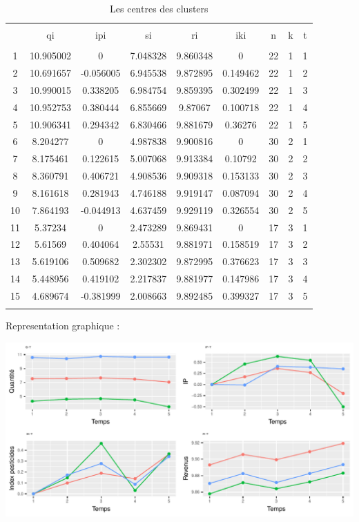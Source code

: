 \documentclass[11pt,]{article}
\begin{document}
\begin{table}[!htbp] \centering 
  \caption{Les centres des clusters} 
  \label{} 
\begin{tabular}{@{\extracolsep{5pt}} ccccccccc} 
\\[-1.8ex]\hline 
\hline \\[-1.8ex] 
 & qi & ipi & si & ri & iki & n & k & t \\ 
\hline \\[-1.8ex] 
1 & 10.905002 & 0 & 7.048328 & 9.860348 & 0 & 22 & 1 & 1 \\ 
2 & 10.691657 & -0.056005 & 6.945538 & 9.872895 & 0.149462 & 22 & 1 & 2 \\ 
3 & 10.990015 & 0.338205 & 6.984754 & 9.859395 & 0.302499 & 22 & 1 & 3 \\ 
4 & 10.952753 & 0.380444 & 6.855669 & 9.87067 & 0.100718 & 22 & 1 & 4 \\ 
5 & 10.906341 & 0.294342 & 6.830466 & 9.881679 & 0.36276 & 22 & 1 & 5 \\ 
6 & 8.204277 & 0 & 4.987838 & 9.900816 & 0 & 30 & 2 & 1 \\ 
7 & 8.175461 & 0.122615 & 5.007068 & 9.913384 & 0.10792 & 30 & 2 & 2 \\ 
8 & 8.360791 & 0.406721 & 4.908536 & 9.909318 & 0.153133 & 30 & 2 & 3 \\ 
9 & 8.161618 & 0.281943 & 4.746188 & 9.919147 & 0.087094 & 30 & 2 & 4 \\ 
10 & 7.864193 & -0.044913 & 4.637459 & 9.929119 & 0.326554 & 30 & 2 & 5 \\ 
11 & 5.37234 & 0 & 2.473289 & 9.869431 & 0 & 17 & 3 & 1 \\ 
12 & 5.61569 & 0.404064 & 2.55531 & 9.881971 & 0.158519 & 17 & 3 & 2 \\ 
13 & 5.619106 & 0.509682 & 2.302302 & 9.872995 & 0.376623 & 17 & 3 & 3 \\ 
14 & 5.448956 & 0.419102 & 2.217837 & 9.881977 & 0.147986 & 17 & 3 & 4 \\ 
15 & 4.689674 & -0.381999 & 2.008663 & 9.892485 & 0.399327 & 17 & 3 & 5 \\ 
\hline \\[-1.8ex] 
\end{tabular} 
\end{table}

Representation graphique :

\begin{center}\includegraphics{note2pres_files/figure-latex/unnamed-chunk-97-1} \end{center}
\end{document}
